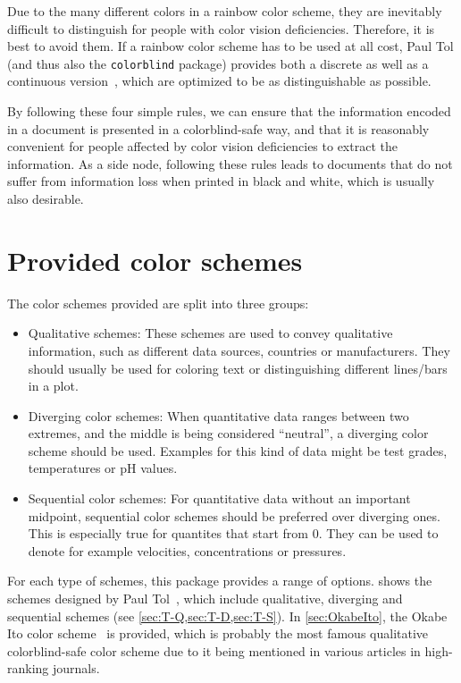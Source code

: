 \documentclass{scrartcl}
\begin{document}
Due to the many different colors in a rainbow color scheme, they are inevitably difficult to distinguish for people with color vision deficiencies.
Therefore, it is best to avoid them.
If a rainbow color scheme has to be used at all cost, Paul Tol (and thus also the \texttt{colorblind} package) provides both a discrete as well as a continuous version~\cite{Tol}, which are optimized to be as distinguishable as possible.

By following these four simple rules, we can ensure that the information encoded in a document is presented in a colorblind-safe way, and that it is reasonably convenient for people affected by color vision deficiencies to extract the information.
As a side node, following these rules leads to documents that do not suffer from information loss when printed in black and white, which is usually also desirable.

\section{Provided color schemes}\label{sec:colors}
The color schemes provided are split into three groups:
\begin{itemize}
    \item Qualitative schemes:\newline
        These schemes are used to convey qualitative information, such as different data sources, countries or manufacturers.
        They should usually be used for coloring text or distinguishing different lines/bars in a plot.
    \item Diverging color schemes:\newline
        When quantitative data ranges between two extremes, and the middle is being considered ``neutral'', a diverging color scheme should be used.
        Examples for this kind of data might be test grades, temperatures or pH values.
    \item Sequential color schemes:\newline
        For quantitative data without an important midpoint, sequential color schemes should be preferred over diverging ones.
        This is especially true for quantites that start from $0$.
        They can be used to denote for example velocities, concentrations or pressures.
\end{itemize}

For each type of schemes, this package provides a range of options.
 shows the schemes designed by Paul Tol~\cite{Tol}, which include qualitative, diverging and sequential schemes (see \cref{sec:T-Q,sec:T-D,sec:T-S}).
In \cref{sec:OkabeIto}, the Okabe Ito color scheme~\cite{Ichihara_2008} is provided, which is probably the most famous qualitative colorblind-safe color scheme due to it being mentioned in various articles in high-ranking journals.
\end{document}
